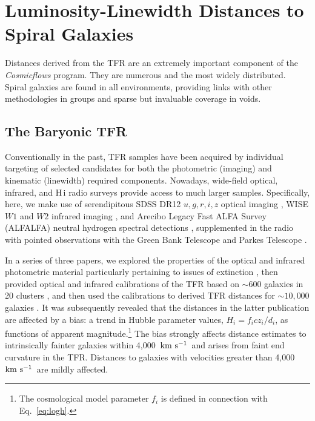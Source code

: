 \documentclass[twocolumn]{aastex63}
\newcommand{\kms}{\mbox{${\rm km~s^{-1}}$}}
\newcommand{\hi}{H{\sc\,i} }
\begin{document}

\section{Luminosity-Linewidth Distances to Spiral Galaxies}
\label{sec:TFR}




Distances derived from the TFR are an extremely important component of the {\it Cosmicflows} program.  They are numerous and the most widely distributed.  Spiral galaxies are found in all environments, providing links with other methodologies in groups and sparse but invaluable coverage in voids.  


\subsection{The Baryonic TFR}

Conventionally in the past, TFR samples have been acquired by individual targeting of selected candidates for both the photometric (imaging) and kinematic (linewidth) required components.  Nowadays, wide-field optical, infrared, and \hi radio surveys provide access to much larger samples.  Specifically, here, we make use of serendipitous SDSS DR12 $u,g,r,i,z$ optical imaging \citep{2015ApJS..219...12A}, WISE $W1$ and $W2$ infrared imaging \citep{2010AJ....140.1868W, 2011ApJ...731...53M}, and Arecibo Legacy Fast ALFA Survey (ALFALFA) neutral hydrogen spectral detections \citep{2018ApJ...861...49H}, supplemented in the radio with pointed observations with the Green Bank Telescope and Parkes Telescope \citep{2021A&A...646A.113D}.  

In a series of three papers, we explored the properties of the optical and infrared photometric material particularly pertaining to issues of extinction \citep{2019ApJ...884...82K}, then provided optical and infrared calibrations of the TFR based on $\sim 600$ galaxies in 20 clusters \citep{2020ApJ...896....3K}, and then used the calibrations to derived TFR distances for $\sim 10,000$ galaxies \citep{2020ApJ...902..145K}.  It was subsequently revealed that the distances in the latter publication are affected by a bias: a trend in Hubble parameter values, $H_i=f_icz_i/d_i$, as functions of apparent magnitude.\footnote{The cosmological model parameter $f_i$ is defined in connection with Eq.~\ref{eq:logh}.} The bias strongly affects distance estimates to intrinsically fainter galaxies within 4,000~\kms\ and arises from faint end curvature in the TFR.  Distances to galaxies with velocities greater than 4,000~\kms\ are mildly affected.
\end{document}
